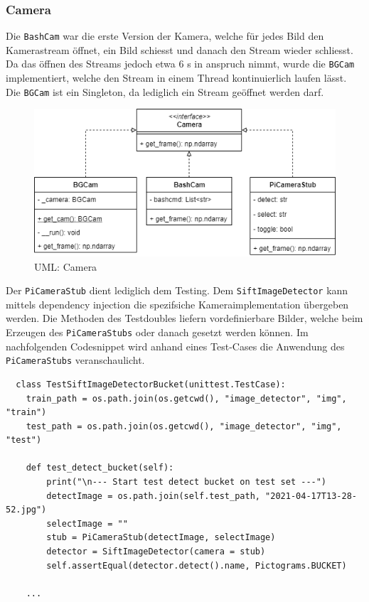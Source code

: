 \newpage

\subsubsection{Camera}
Die \texttt{BashCam} war die erste Version der Kamera, welche für jedes Bild den Kamerastream öffnet, ein Bild schiesst und danach den Stream wieder schliesst. Da das öffnen des Streams jedoch etwa 6 s in anspruch nimmt, wurde die \texttt{BGCam} implementiert, welche den Stream in einem Thread kontinuierlich laufen lässt. Die \texttt{BGCam} ist ein Singleton, da lediglich ein Stream geöffnet werden darf.

\begin{figure}[H]
  \includegraphics[width=1\textwidth]{img/softwarearchitektur/UML-Camera.png}
  \centering
  \caption{UML: Camera}
  \label{fig:uml-camera}
\end{figure}

Der \texttt{PiCameraStub} dient lediglich dem Testing. Dem \texttt{SiftImageDetector} kann mittels dependency injection die spezifsiche Kameraimplementation übergeben werden. Die Methoden des Testdoubles liefern vordefinierbare Bilder, welche beim Erzeugen des \texttt{PiCameraStubs} oder danach gesetzt werden können. Im nachfolgenden Codesnippet wird anhand eines Test-Cases die Anwendung des \texttt{PiCameraStubs} veranschaulicht.

\begin{verbatim}
  class TestSiftImageDetectorBucket(unittest.TestCase):
    train_path = os.path.join(os.getcwd(), "image_detector", "img", "train")
    test_path = os.path.join(os.getcwd(), "image_detector", "img", "test")

    def test_detect_bucket(self):
        print("\n--- Start test detect bucket on test set ---")
        detectImage = os.path.join(self.test_path, "2021-04-17T13-28-52.jpg")
        selectImage = ""
        stub = PiCameraStub(detectImage, selectImage)
        detector = SiftImageDetector(camera = stub)
        self.assertEqual(detector.detect().name, Pictograms.BUCKET)
        
    ...
 \end{verbatim}
 
